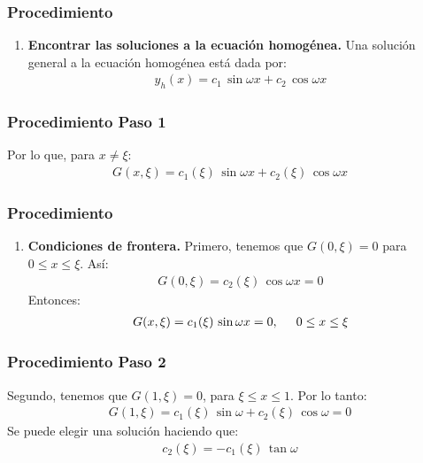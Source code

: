 \documentclass[12pt]{beamer}
\begin{document}
\begin{frame}
\frametitle{Procedimiento}
\begin{enumerate}[<+->]
\item \textbf{Encontrar las soluciones a la ecuación homogénea.}
\pause
Una solución general a la ecuación homogénea está dada por:
\pause
\begin{align*}
y_{h} (x) = c_{1} \, \sin \omega x + c_{2} \, \cos \omega x
\end{align*}
\seti
\end{enumerate}
\end{frame}

\begin{frame}
\frametitle{Procedimiento Paso 1}
Por lo que, para $x \neq \xi$:
\pause
\begin{align*}
G (x, \xi) = c_{1} (\xi) \, \sin \omega x + c_{2} (\xi) \, \cos \omega x
\end{align*}
\end{frame}

\begin{frame}
\frametitle{Procedimiento}
\begin{enumerate}[<+->]
\conti
\item \textbf{Condiciones de frontera.}
\pause
Primero, tenemos que $G (0, \xi) = 0$ para $0 \leq x \leq \xi$. Así:
\pause
\begin{align*}
G (0, \xi) = c_{2} (\xi) \, \cos \omega x = 0
\end{align*}
\pause
Entonces:
\pause
\begin{align*}
G (x, \xi) = c_{1} (\xi) \, \sin \omega x = 0, \hspace{0.5cm} 0 \leq x \leq \xi
\end{align*}
\seti
\end{enumerate}
\end{frame}

\begin{frame}
\frametitle{Procedimiento Paso 2}
Segundo, tenemos que $G (1, \xi) = 0$, para $\xi \leq x \leq 1$. Por lo tanto:
\pause
\begin{align*}
G (1, \xi) = c_{1} (\xi) \, \sin \omega + c_{2} (\xi) \, \cos \omega = 0
\end{align*}
\pause
Se puede elegir una solución haciendo que:
\pause
\begin{align*}
c_{2} (\xi) = - c_{1} (\xi) \, \tan \omega
\end{align*}
\end{frame}
\end{document}
